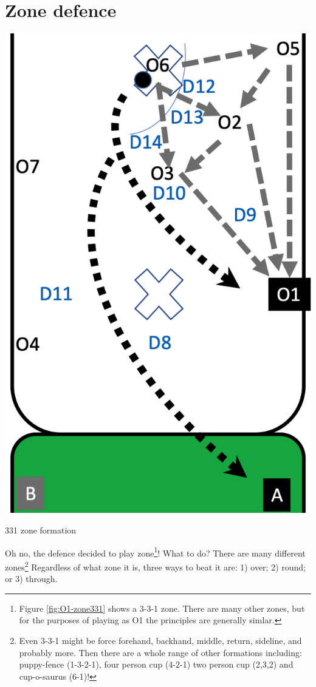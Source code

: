 \documentclass{tufte-handout}
\begin{document}
\section{Zone defence}\label{sec:zone}

\begin{marginfigure}%
  \includegraphics[width=\linewidth]{O1-zone331}
  \caption{331 zone formation}
  \label{fig:O1-zone331}
\end{marginfigure}

Oh no, 
the defence decided to play zone\footnote{
Figure \ref{fig:O1-zone331} shows a 3-3-1 zone.  
There are many other zones, 
but for the purposes of playing as O1
the principles are generally simlar.}! 
What to do? 
There are many different zones\footnote{
Even 3-3-1 might be force 
forehand, 
backhand,
middle, 
return,
sideline,
and probably more. 
Then there are 
a whole range of other formations
including:
puppy-fence (1-3-2-1),
four person cup (4-2-1)
two person cup (2,3,2) and
cup-o-saurus (6-1)!}
Regardless of what zone it is,
three ways to beat it are:
1) over;
2) round; or
3) through. 
\end{document}
